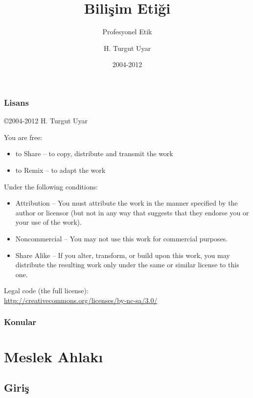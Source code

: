 \documentclass[dvipsnames]{beamer}
\title{Bilişim Etiği}
\subtitle{Profesyonel Etik}
\author{H. Turgut Uyar}
\date{2004-2012}
\theoremstyle{definition}
\theoremstyle{example}
\theoremstyle{plain}
\begin{document}
\begin{frame}
  \titlepage
\end{frame}

\begin{frame}
  \frametitle{Lisans}

  \hfill
  \copyright 2004-2012 H. Turgut Uyar

  \vfill
  \begin{tiny}
    You are free:
    \begin{itemize}
      \item to Share -- to copy, distribute and transmit the work
      \item to Remix -- to adapt the work
    \end{itemize}

    Under the following conditions:
    \begin{itemize}
      \item Attribution -- You must attribute the work in the manner specified by
        the author or licensor (but not in any way that suggests that they
        endorse you or your use of the work).

      \item Noncommercial -- You may not use this work for commercial purposes.

      \item Share Alike -- If you alter, transform, or build upon this work, you
        may distribute the resulting work only under the same or similar license
        to this one.
    \end{itemize}
  \end{tiny}

  \vfill
  Legal code (the full license):\\
  \url{http://creativecommons.org/licenses/by-nc-sa/3.0/}
\end{frame}

\begin{frame}
  \frametitle{Konular}
  \tableofcontents
\end{frame}

\section{Meslek Ahlakı}

\subsection{Giriş}
\end{document}

